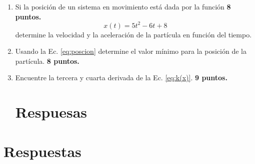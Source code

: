 \documentclass{article}
\begin{document}
\begin{enumerate}
\item Si la posición de un sistema en movimiento está dada por la función
\hfill \textbf{8 puntos.}
\begin{equation}\label{eq:poscion}
x(t)= 5t^{2} - 6t + 8
\end{equation}
determine la velocidad y la aceleración de la partícula en función del tiempo.

\item Usando la Ec. \eqref{eq:poscion} determine el valor mínimo para la
posición de la partícula.
\hfill \textbf{8 puntos.}

\item Encuentre la tercera y cuarta derivada de la Ec. \eqref{eq:k(x)}.
\hfill \textbf{9 puntos.}

\clearpage

\section{Respuesas} %
\label{sec:respuesas}


\end{enumerate}

\clearpage

\section{Respuestas} %
\label{sec:respuestas}







\end{document}
